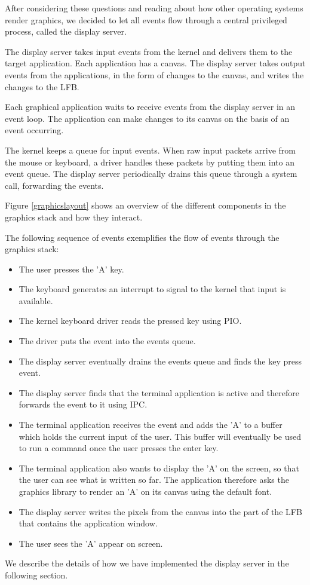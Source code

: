 \documentclass{report}
\begin{document}
After considering these questions and reading about how other operating
systems render graphics, we decided to let all events flow through a central
privileged process, called the display server. 

The display server takes input events from the kernel and delivers them to the
target application. Each application has a canvas. The display server takes
output events from the applications, in the form of changes to the canvas, and
writes the changes to the LFB.

Each graphical application waits to receive events from the display server in
an event loop. The application can make changes to its canvas on the basis of
an event occurring.

The kernel keeps a queue for input events. When raw input packets arrive from
the mouse or keyboard, a driver handles these packets by putting them into an
event queue. The display server periodically drains this queue through a
system call, forwarding the events.

Figure \ref{graphicslayout} shows an overview of the different components in
the graphics stack and how they interact. 

The following sequence of events exemplifies the flow of events through the
graphics stack:
\begin{itemize}
\item The user presses the 'A' key.
\item The keyboard generates an interrupt to signal to the kernel that input
is available.
\item The kernel keyboard driver reads the pressed key using PIO.
\item The driver puts the event into the events queue.
\item The display server eventually drains the events queue and finds the key
press event.
\item The display server finds that the terminal application is active and
therefore forwards the event to it using IPC.
\item The terminal application receives the event and adds the 'A' to a buffer
which holds the current input of the user. This buffer will eventually be used
to run a command once the user presses the enter key.
\item The terminal application also wants to display the 'A' on the screen, so
that the user can see what is written so far. The application therefore asks
the graphics library to render an 'A' on its canvas using the default font.
\item The display server writes the pixels from the canvas into the part of the
LFB that contains the application window.
\item The user sees the 'A' appear on screen.
\end{itemize}
We describe the details of how we have implemented the display server in the
following section.
\end{document}
